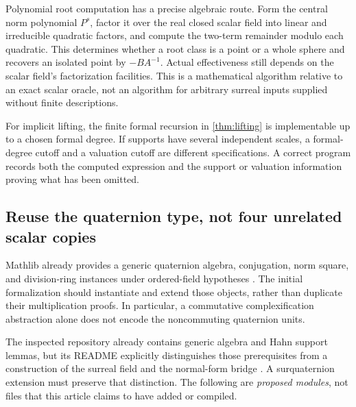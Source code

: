 \documentclass[11pt,letterpaper]{article}
\theoremstyle{definition}
\begin{document}
Polynomial root computation has a precise algebraic route. Form the central
norm polynomial $P^s$, factor it over the real closed scalar field into linear
and irreducible quadratic factors, and compute the two-term remainder modulo
each quadratic. This determines whether a root class is a point or a whole
sphere and recovers an isolated point by $-BA^{-1}$. Actual effectiveness still
depends on the scalar field's factorization facilities. This is a mathematical
algorithm relative to an exact scalar oracle, not an algorithm for arbitrary
surreal inputs supplied without finite descriptions.

For implicit lifting, the finite formal recursion in
\cref{thm:lifting} is implementable up to a chosen formal degree. If supports
have several independent scales, a formal-degree cutoff and a valuation
cutoff are different specifications. A correct program records both the
computed expression and the support or valuation information proving what
has been omitted.

\subsection{Reuse the quaternion type, not four unrelated scalar copies}
Mathlib already provides a generic quaternion algebra, conjugation, norm
square, and division-ring instances under ordered-field hypotheses
\cite{mathlib}. The initial formalization should instantiate and extend those
objects, rather than duplicate their multiplication proofs. In particular,
a commutative complexification abstraction alone does not encode the
noncommuting quaternion units.

The inspected repository already contains generic algebra and Hahn support
lemmas, but its README explicitly distinguishes those prerequisites from a
construction of the surreal field and the normal-form bridge \cite{repo}.
A surquaternion extension must preserve that distinction. The following are
\emph{proposed modules}, not files that this article claims to have added or
compiled.
\end{document}
